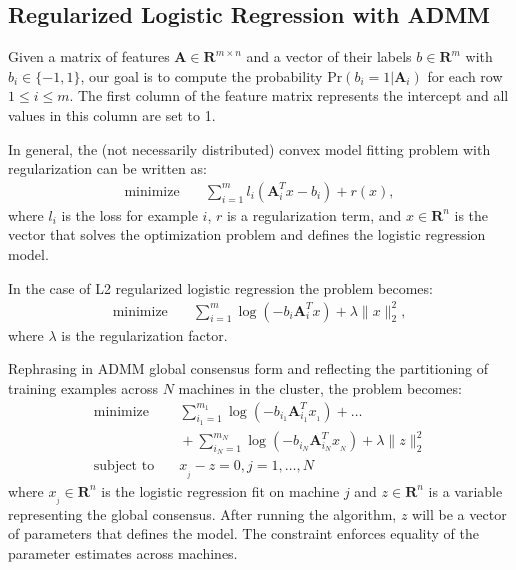 \documentclass[10pt, conference, compsocconf]{IEEEtran}
\begin{document}
\subsection{Regularized Logistic Regression with ADMM}
Given a matrix of features $\mathbf{A}\in\mathbf{R}^{m\times n}$ and a vector of their labels $b\in\mathbf{R}^m$ with $b_i\in\{-1,1\}$, our goal is to compute the probability $\text{Pr}(b_i=1|\mathbf{A}_i)$ for each row $1\leq i\leq m$.  The first column of the feature matrix represents the intercept and all values in this column are set to 1.

In general, the (not necessarily distributed) convex model fitting problem with regularization can be written as:
\begin{align*}
\text{minimize}&\quad \sum_{i=1}^m l_i(\mathbf{A}_i^Tx - b_i) + r(x),
\end{align*}
where $l_i$ is the loss for example $i$, $r$ is a regularization term, and $x\in\mathbf{R}^n$ is the vector that solves the optimization problem and defines the logistic regression model.

In the case of L2 regularized logistic regression the problem becomes:
\begin{align*}
\text{minimize}&\quad \sum_{i=1}^m \log(-b_i\mathbf{A}_i^Tx) + \lambda\|x\|_2^2,
\end{align*}
where $\lambda$ is the regularization factor.

Rephrasing in ADMM global consensus form and reflecting the partitioning of training examples across $N$ machines in the cluster, the problem becomes:
\begin{align*}
\text{minimize}&\quad \sum_{i_1=1}^{m_1} \log(-b_{i_1}\mathbf{A}_{i_1}^Tx_{_1})+\ldots \\
&\quad+\sum_{i_N=1}^{m_N} \log(-b_{i_N}\mathbf{A}_{i_N}^Tx_{_N})+\lambda\|z\|_2^2\\
\text{subject to}&\quad x_{_j} - z = 0, j = 1, \ldots, N
\end{align*}
where $x_{_j}\in\mathbf{R}^n$ is the logistic regression fit on machine $j$ and $z\in\mathbf{R}^n$ is a variable representing the global consensus.  After running the algorithm, $z$ will be a vector of parameters that defines the model. The constraint enforces equality of the parameter estimates across machines.
\end{document}
